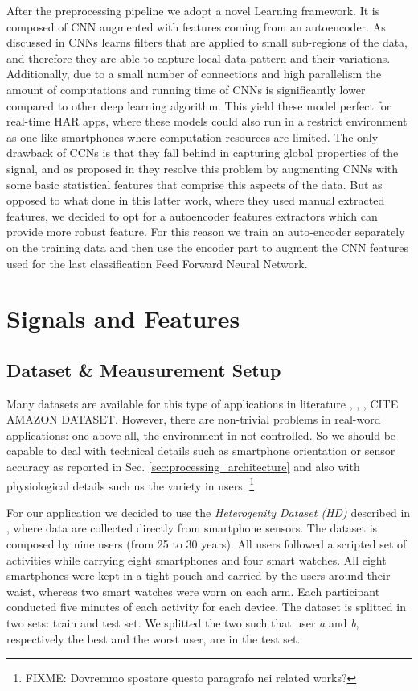 After the preprocessing pipeline we adopt a novel Learning framework. It is composed of CNN augmented with features coming from an autoencoder. As discussed in \cite{ignatov2018real} CNNs learns filters that are applied to small sub-regions of the data, and therefore they are able to capture local data pattern and their variations. Additionally, due to a small number of connections and high parallelism the amount of computations and running time of CNNs is significantly lower compared to other deep learning algorithm. This yield these model perfect for real-time HAR apps, where these models could also run in a restrict environment as one like smartphones where computation resources are limited. The only drawback of CCNs is that they fall behind in capturing global properties of the signal, and as proposed in \cite{ignatov2018real} they resolve this problem by augmenting CNNs with some basic statistical features that comprise this aspects of the data. But as opposed to what done in this latter work, where they used manual extracted features, we decided to opt for a autoencoder features extractors which can provide more robust feature. For this reason we train an auto-encoder separately on the training data and then use the encoder part to augment the CNN features used for the last classification Feed Forward Neural Network.

\section{Signals and Features}
\label{sec:signals-and-features}

\subsection{Dataset \& Meausurement Setup}
\label{subsec:dataset-measurement-setup}

Many datasets are available for this type of applications in
literature \cite{stisen2015smart}, \cite{anguita2013public},
\cite{blunck2013heterogeneity}, CITE AMAZON DATASET. However, there
are non-trivial problems in real-word applications: one above all, the
environment in not controlled. So we should be capable to deal with
technical details such as smartphone orientation or sensor accuracy as
reported in Sec. \ref{sec:processing_architecture} and also with
physiological details such us the variety in users. \footnote{FIXME:
  Dovremmo spostare questo paragrafo nei related works?}

For our application we decided to use the \textit{Heterogenity Dataset (HD)} described in
\cite{blunck2013heterogeneity}, where data are collected directly from
smartphone sensors. The dataset is composed by nine users (from 25 to
30 years). All users followed a scripted set of activities while
carrying eight smartphones and four smart watches. All eight
smartphones were kept in a tight pouch and carried by the users around
their waist, whereas two smart watches were worn on each arm. Each
participant conducted five minutes of each activity for each device.
The dataset is splitted in two sets: train and test set. We splitted
the two such that user \textit{a} and \textit{b}, respectively the
best and the worst user, are in the test set.

